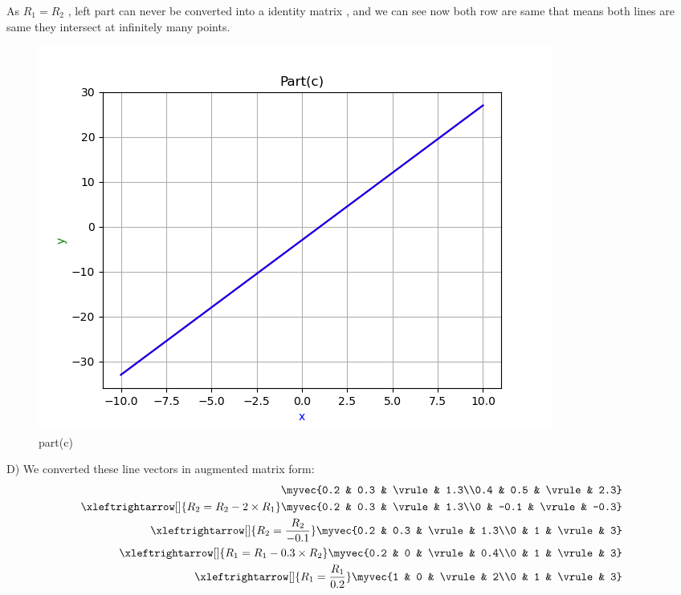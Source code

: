 \begin{enumerate}[label=\thesection.\arabic*.,ref=\thesection.\theenumi]
As $R_{1}=R_{2}$ , left part can never be converted into a identity matrix , and we can see now both row are same that means both lines are same they intersect at infinitely many points.\\

\renewcommand{\thefigure}{\theenumi.\arabic{figure}}
\begin{figure}[!ht]
    \centering
    \includegraphics[width=\columnwidth]{./figures/A1_partc}
\caption{part(c)}
\label{fig: part(c)}
\end{figure}

D)
We converted these line vectors in augmented matrix form:\\ 

\begin{align*}
    \myvec{0.2 & 0.3 & \vrule & 1.3\\0.4 & 0.5 & \vrule & 2.3}
\\
    \xleftrightarrow[]{R_{2}=R_{2}-2\times R_{1}} \myvec{0.2 & 0.3 & \vrule & 1.3\\0 & -0.1 & \vrule & -0.3}
\\
    \xleftrightarrow[]{R_{2}=\frac{R_{2}}{-0.1}} \myvec{0.2 & 0.3 & \vrule & 1.3\\0 & 1 & \vrule & 3}
\\
    \xleftrightarrow[]{R_{1}=R_{1}-0.3 \times R_{2}} \myvec{0.2 & 0 & \vrule & 0.4\\0 & 1 & \vrule & 3}
\\
    \xleftrightarrow[]{R_{1}=\frac{R_{1}}{0.2}} \myvec{1 & 0 & \vrule & 2\\0 & 1 & \vrule & 3}
\end{align*}


\end{enumerate}
